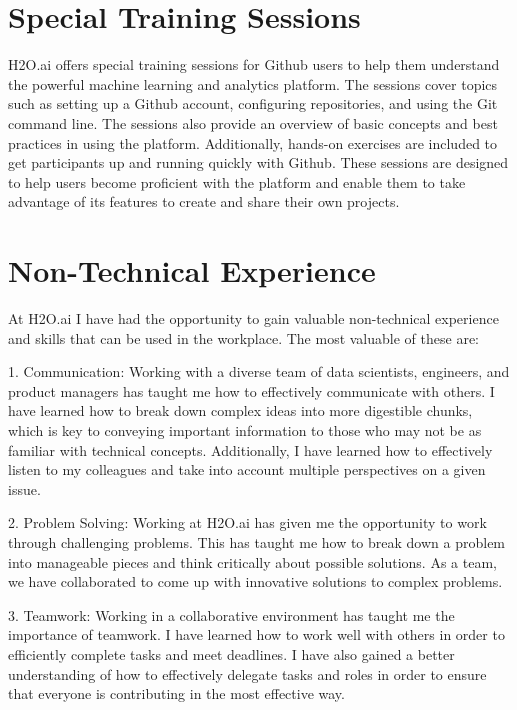 \documentclass[12pt,a4paper]{report}
\begin{document}
\section{Special Training Sessions}

H2O.ai offers special training sessions for Github users to help them understand the powerful machine learning and analytics platform. The sessions cover topics such as setting up a Github account, configuring repositories, and using the Git command line. The sessions also provide an overview of basic concepts and best practices in using the platform. Additionally, hands-on exercises are included to get participants up and running quickly with Github. These sessions are designed to help users become proficient with the platform and enable them to take advantage of its features to create and share their own projects.

\section{Non-Technical Experience}


At H2O.ai I have had the opportunity to gain valuable non-technical experience and skills that can be used in the workplace. The most valuable of these are: 

1. Communication: Working with a diverse team of data scientists, engineers, and product managers has taught me how to effectively communicate with others. I have learned how to break down complex ideas into more digestible chunks, which is key to conveying important information to those who may not be as familiar with technical concepts. Additionally, I have learned how to effectively listen to my colleagues and take into account multiple perspectives on a given issue.

2. Problem Solving: Working at H2O.ai has given me the opportunity to work through challenging problems. This has taught me how to break down a problem into manageable pieces and think critically about possible solutions. As a team, we have collaborated to come up with innovative solutions to complex problems.

3. Teamwork: Working in a collaborative environment has taught me the importance of teamwork. I have learned how to work well with others in order to efficiently complete tasks and meet deadlines. I have also gained a better understanding of how to effectively delegate tasks and roles in order to ensure that everyone is contributing in the most effective way.
\end{document}
